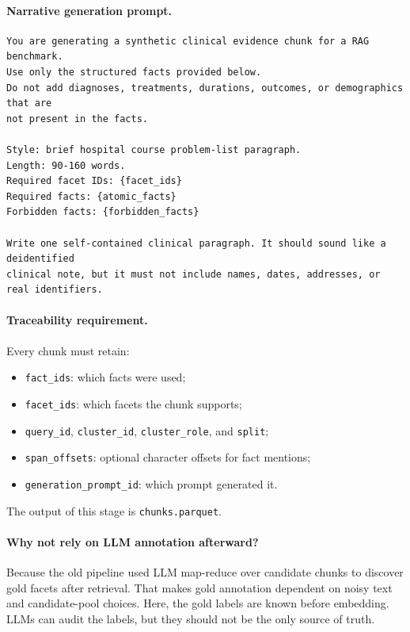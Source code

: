 \documentclass[11pt,a4paper]{article}
\newcommand{\field}[1]{\texttt{#1}}
\begin{document}
\paragraph{Narrative generation prompt.}

\begin{lstlisting}[style=promptstyle]
You are generating a synthetic clinical evidence chunk for a RAG benchmark.
Use only the structured facts provided below.
Do not add diagnoses, treatments, durations, outcomes, or demographics that are
not present in the facts.

Style: brief hospital course problem-list paragraph.
Length: 90-160 words.
Required facet IDs: {facet_ids}
Required facts: {atomic_facts}
Forbidden facts: {forbidden_facts}

Write one self-contained clinical paragraph. It should sound like a deidentified
clinical note, but it must not include names, dates, addresses, or real identifiers.
\end{lstlisting}

\paragraph{Traceability requirement.}
Every chunk must retain:

\begin{itemize}[leftmargin=*]
	\item \field{fact\_ids}: which facts were used;
	\item \field{facet\_ids}: which facets the chunk supports;
	\item \field{query\_id}, \field{cluster\_id}, \field{cluster\_role}, and \field{split};
	\item \field{span\_offsets}: optional character offsets for fact mentions;
	\item \field{generation\_prompt\_id}: which prompt generated it.
\end{itemize}

The output of this stage is \field{chunks.parquet}.

\paragraph{Why not rely on LLM annotation afterward?}
Because the old pipeline used LLM map-reduce over candidate chunks to discover gold facets after retrieval. That makes gold annotation dependent on noisy text and candidate-pool choices. Here, the gold labels are known before embedding. LLMs can audit the labels, but they should not be the only source of truth.
\end{document}
